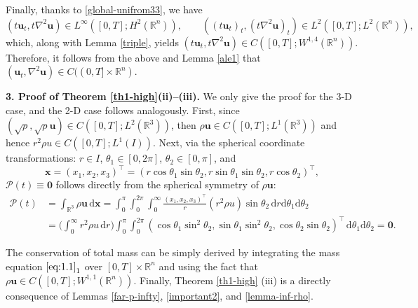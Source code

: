 \documentclass[11pt,reqno]{amsart}
\numberwithin{rk}{section}
\numberwithin{prop}{section}
\numberwithin{mydef}{section}
\numberwithin{lem}{section}
\numberwithin{equation}{section}
\numberwithin{thm}{section}
\begin{document}
Finally, thanks to \eqref{global-unifrom33}, we have 
\begin{equation*}
(t\boldsymbol{u}_t,t\nabla^2\boldsymbol{u})\in L^\infty([0,T];H^2(\mathbb{R}^n)), \qquad
((t\boldsymbol{u}_t)_t,(t\nabla^2\boldsymbol{u})_t)\in L^2([0,T];L^2(\mathbb{R}^n)),
\end{equation*}
which, along with Lemma \ref{triple}, yields $(t\boldsymbol{u}_t,t\nabla^2\boldsymbol{u})\in C([0,T];W^{1,4}(\mathbb{R}^n))$. Therefore, it follows from the above  and Lemma \ref{ale1} that $(\boldsymbol{u}_t,\nabla^2\boldsymbol{u})\in C((0,T]\times \mathbb{R}^n)$. 



\medskip
\textbf{3. Proof of Theorem \ref{th1-high}(ii)--(iii).}  We only give the proof for the 3-D case, and the 2-D case follows analogously. First, since $(\sqrt{\rho},\sqrt{\rho}\boldsymbol{u})\in C([0,T];L^2(\mathbb{R}^3))$, then $\rho\boldsymbol{u}\in C([0,T];L^1(\mathbb{R}^3))$ and hence $r^2\rho u\in C([0,T];L^1(I))$. 
Next, via the spherical coordinate transformations: $r\in I$, $\theta_1\in [0,2\pi]$, $\theta_2\in [0,\pi]$, and
\begin{equation*}
\boldsymbol{x}=(x_1,x_2,x_3)^\top=(r\cos\theta_1\sin\theta_2,r\sin\theta_1\sin\theta_2,r\cos\theta_2)^\top,
\end{equation*}
$\mathcal{P}(t)\equiv \boldsymbol{0}$ follows directly  from the spherical symmetry of $\rho\boldsymbol{u}$:
\begin{equation*}
\begin{aligned}
\mathcal{P}(t)&=\int_{\mathbb{R}^3} \rho\boldsymbol{u}\,\mathrm{d}\boldsymbol{x}=\int_0^\pi\int_0^{2\pi}\int_0^\infty \frac{(x_1,x_2,x_3)^\top}{r}(r^2\rho u)\sin\theta_2\,\mathrm{d}r\mathrm{d}\theta_1\mathrm{d}\theta_2\\
&=\Big(\int_0^\infty  r^2 \rho u \,\mathrm{d}r\Big)\int_0^\pi\int_0^{2\pi} (\cos\theta_1\sin^2\theta_2,\sin\theta_1\sin^2\theta_2,\cos\theta_2\sin\theta_2)^\top \, \mathrm{d}\theta_1\mathrm{d}\theta_2 =\boldsymbol{0}.     
\end{aligned}
\end{equation*}
 

The conservation of total mass can be simply derived by integrating the mass equation $\eqref{eq:1.1}_1$ over $[0,T]\times \mathbb{R}^n$ and using the fact that $\rho\boldsymbol{u} \in C([0,T];W^{1,1}(\mathbb{R}^n))$.  Finally, Theorem \ref{th1-high} (iii) is a directly consequence of Lemmas \ref{far-p-infty}, \ref{important2}, and \ref{lemma-inf-rho}.  
\end{document}
